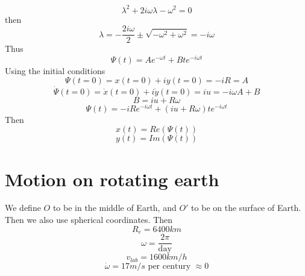 \documentclass{article}
\newtheorem{one minute paper}[theorem]{One Minute Paper}
\begin{document}
\begin{enumerate}
\begin{equation}
        \lambda^2 + 2i\omega\lambda - \omega^2 = 0
    \end{equation}
    then 
    \begin{equation}
        \lambda = -\frac{2i \omega}{2} \pm \sqrt{-\omega^2 + \omega^2} = -i\omega
    \end{equation}
    Thus 
    \begin{equation}
        \Psi(t) = Ae^{-\omega t} + Bte^{-i\omega t}
    \end{equation}
    Using the initial conditions 
    \begin{equation}
        \Psi(t=0) = x(t=0) + iy(t=0) = -iR = A
    \end{equation}
    \begin{equation}
        \dot{\Psi}(t=0) = \dot{x}(t=0) + i\dot{y}(t=0) = iu = -i\omega A + B
    \end{equation}
    \begin{equation}
        B = iu + R\omega 
    \end{equation}
    \begin{equation}
        \Psi(t) = -iRe^{-i\omega t} + (iu + R\omega)te^{-i\omega t}
    \end{equation}
    Then 
    \begin{equation}
        x(t) = Re(\Psi(t))
    \end{equation}
    \begin{equation}
        y(t) = Im(\Psi(t))
    \end{equation}
\end{enumerate}

\section*{Motion on rotating earth}

We define $O$ to be in the middle of Earth, and $O'$ to be on the surface of Earth. Then we also use spherical coordinates. Then 
\begin{equation}
    R_{e} = 6400 km
\end{equation}
\begin{equation}
    \omega = \frac{2\pi}{\text{day}}
\end{equation}
\begin{equation}
    v_{lab} = 1600 km/h
\end{equation}
\begin{equation}
    \dot{\omega} = 17m/s \text{ per century } \approx 0
\end{equation}
\end{document}
